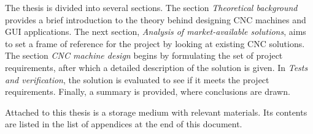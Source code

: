 The thesis is divided into several sections. The section \textit{Theoretical
background} provides a brief introduction to the theory behind designing CNC
machines and GUI applications. The next section, \textit{Analysis of
market-available solutions}, aims to set a frame of reference for the project by
looking at existing CNC solutions. The section \textit{CNC machine design}
begins by formulating the set of project requirements, after which a detailed
description of the solution is given. In \textit{Tests and verification}, the
solution is evaluated to see if it meets the project requirements. Finally, a
summary is provided, where conclusions are drawn.

Attached to this thesis is a storage medium with relevant materials. Its
contents are listed in the list of appendices at the end of this document.
